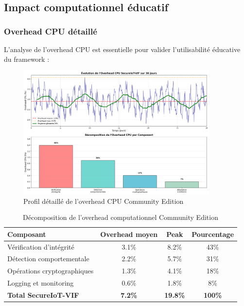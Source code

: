 \subsection{Impact computationnel éducatif}

\subsubsection{Overhead CPU détaillé}

L'analyse de l'overhead CPU est essentielle pour valider l'utilisabilité éducative du framework :

\begin{figure}[h]
    \centering
    \includegraphics[width=0.9\textwidth]{assets/figures/cpu_overhead_esp32_detailed.png}
    \caption{Profil détaillé de l'overhead CPU Community Edition}
    \label{fig:cpu-overhead-community}
\end{figure}

\begin{table}[h]
\centering
\caption{Décomposition de l'overhead computationnel Community Edition}
\label{tab:cpu-breakdown-community}
\begin{tabular}{|l|c|c|c|}
\hline
\textbf{Composant} & \textbf{Overhead moyen} & \textbf{Peak} & \textbf{Pourcentage} \\
\hline
Vérification d'intégrité & 3.1\% & 8.2\% & 43\% \\
Détection comportementale & 2.2\% & 5.7\% & 31\% \\
Opérations cryptographiques & 1.3\% & 4.1\% & 18\% \\
Logging et monitoring & 0.6\% & 1.8\% & 8\% \\
\hline
\textbf{Total SecureIoT-VIF} & \textbf{7.2\%} & \textbf{19.8\%} & \textbf{100\%} \\
\hline
\end{tabular}
\end{table}

